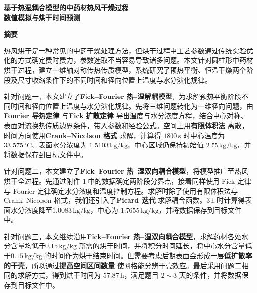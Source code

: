 \documentclass[12pt,a4paper]{article}
\begin{document}
\begin{center}
	\vspace*{-1em} %
	
	\LARGE \textbf{基于热湿耦合模型的中药材热风干燥过程}\\[0.3em]
	\LARGE \textbf{数值模拟与烘干时间预测}
	
	\vspace{-0.5em} %
\end{center}

\begin{center}
	\Large \textbf{摘\quad 要}
\end{center}
\vspace{-0.5em} %

热风烘干是一种常见的中药干燥处理方法，但烘干过程中工艺参数通过传统实验优化的方式确定费时费力，参数选取不当容易导致诸多问题。本文针对圆柱形中药材烘干过程，建立一维轴对称传热传质模型，系统研究了预热平衡、恒温干燥两个阶段及尺寸收缩条件下的不同时间和径向位置上温度与水分演化规律。

针对问题一，本文建立了\textbf{Fick--Fourier 热--湿解耦模型}，为求解预热平衡阶段不同时间和径向位置上温度与水分演化规律。先将三维问题转化为一维径向问题，由\textbf{Fourier 导热定律} 与\textbf{Fick 扩散定律} 导出温度与水分浓度方程，结合中心对称、表面对流换热传质边界条件，带入参数和经验公式。空间上用\textbf{有限体积法} 离散，时间方向使用\textbf{Crank--Nicolson 格式} 求解，计算得 \(1800\,\mathrm{s}\) 时中心温度为 \(33.575\,^\circ\mathrm{C}\)、表面水分浓度为 \(1.5103\,\mathrm{kg/kg}\)，中心区域仍保持初始值 \(2.55\,\mathrm{kg/kg}\)，并将数据保存到目标文件中。

针对问题二，本文建立了\textbf{Fick--Fourier 热--湿双向耦合模型}，将模型推广至热风烘干全过程。先通过附件 1 中的数据确定两阶段分界点，接着同样使用 Fick 定律与 Fourier 定律确定水分浓度和温度控制方程。求解时除了使用有限体积法与 Crank--Nicolson 格式，我们还引入了\textbf{Picard 迭代} 求解耦合函数。\(3\,\mathrm{h}\) 时计算得表面水分浓度降至\(1.0083\,\mathrm{kg/kg}\)，中心为 \(1.7655\,\mathrm{kg/kg}\)，并将数据保存到目标文件中。

针对问题三，本文继续沿用\textbf{Fick--Fourier 热--湿双向耦合模型}，求解药材各处水分含量均低于\(0.15\,\mathrm{kg/kg}\) 所需的烘干时间，并将积分时间延长，将中心水分含量低于\(0.15\,\mathrm{kg/kg}\) 的时间作为烘干结束时间。但需要考虑后期表面会形成一层\textbf{低扩散率的干壳}，所以通过\textbf{提高空间区间数量} 使网格能分辨干壳效应。最后采用问题二相同的求解方式，得到烘干时间为 \(57.87\,\mathrm{h}\)，满足题目 \(2\sim 3\) 天的条件，并将数据保存到目标文件中。
\end{document}
